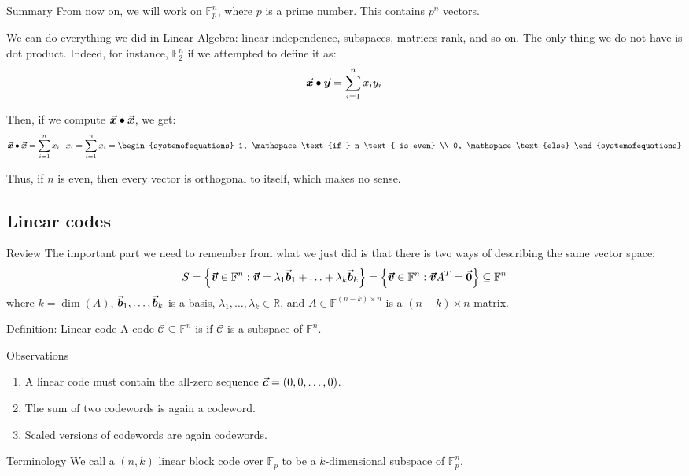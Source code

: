 \documentclass[a4paper]{article}
\begin{document}
\begin{parag}{Summary}
    From now on, we will work on $\mathbb{F}_p^n$, where $p$ is a prime number. This contains $p^n$ vectors.

    We can do everything we did in Linear Algebra: linear independence, subspaces, matrices rank, and so on. The only thing we do not have is dot product. Indeed, for instance, $\mathbb{F}_2^n$ if we attempted to define it as:
    \[\bm{\protect\vec{x}}\bullet \bm{\protect\vec{y}} = \sum_{i=1}^{n} x_i y_i\]

    Then, if we compute $\bm{\protect\vec{x}}\bullet \bm{\protect\vec{x}}$, we get:
    \[\bvec{x} \dotprod \bvec{x} = \sum_{i=1}^{n} x_i \cdot  x_i = \sum_{i=1}^{n} x_i = \begin{systemofequations} 1, \mathspace \text{if } n \text{ is even} \\ 0, \mathspace \text{else} \end{systemofequations}\]

    Thus, if $n$ is even, then every vector is orthogonal to itself, which makes no sense.
\end{parag}


\subsection{Linear codes}
\begin{parag}{Review}
    The important part we need to remember from what we just did is that there is two ways of describing the same vector space: 
    \[S = \left\{\bvec{v} \in \mathbb{F}^n : \bvec{v} = \lambda_1 \bvec{b}_1 + \ldots + \lambda_k \bvec{b}_k\right\} = \left\{\bvec{v} \in \mathbb{F}^n : \bvec{v} A^T = \bvec{0}\right\} \subseteq \mathbb{F}^n\]
    where $k = \dim\left(A\right)$, $\bm{\protect\vec{b}}_1, \ldots, \bm{\protect\vec{b}}_k$ is a basis, $\lambda_1, \ldots, \lambda_k \in \mathbb{R}$, and $A \in \mathbb{F}^{\left(n-k\right)\times n}$ is a $\left(n - k\right) \times n$ matrix.
\end{parag}

\begin{parag}{Definition: Linear code}
    A code $\mathcal{C} \subseteq \mathbb{F}^n$ is  if $\mathcal{C}$ is a subspace of $\mathbb{F}^n$.

    \begin{subparag}{Observations}
        \begin{enumerate}[left=0pt]
            \item A linear code must contain the all-zero sequence $\bvec{c} = \left(0, 0, \ldots, 0\right)$.
            \item The sum of two codewords is again a codeword.
            \item Scaled versions of codewords are again codewords.
        \end{enumerate}
    \end{subparag}

    \begin{subparag}{Terminology}
        We call a $\left(n, k\right)$ linear block code over $\mathbb{F}_p$ to be a $k$-dimensional subspace of $\mathbb{F}_p^n$.
    \end{subparag}
    
\end{parag}
\end{document}
